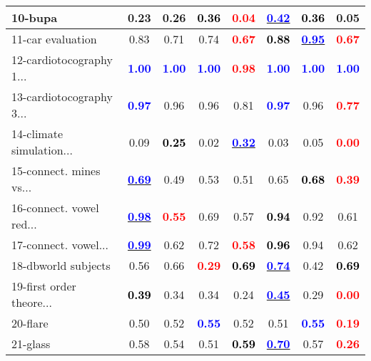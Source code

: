 \begin{table}[h]
\begin{center}
\begin{tabular}{lc|c|c|c|c|c|c}
10-bupa &   0.23 &   0.26 & \textcolor{black}{\textbf{  0.36}} & \textcolor{red}{\textbf{  0.04}} & \underline{\textcolor{blue}{\textbf{  0.42}}} & \textcolor{black}{\textbf{  0.36}} &   0.05 \\ \hline
11-car evaluation &   0.83 &   0.71 &   0.74 & \textcolor{red}{\textbf{  0.67}} & \textcolor{black}{\textbf{  0.88}} & \underline{\textcolor{blue}{\textbf{  0.95}}} & \textcolor{red}{\textbf{  0.67}} \\
12-cardiotocography 1... & \textcolor{blue}{\textbf{  1.00}} & \textcolor{blue}{\textbf{  1.00}} & \textcolor{blue}{\textbf{  1.00}} & \textcolor{red}{\textbf{  0.98}} & \textcolor{blue}{\textbf{  1.00}} & \textcolor{blue}{\textbf{  1.00}} & \textcolor{blue}{\textbf{  1.00}} \\
13-cardiotocography 3... & \textcolor{blue}{\textbf{  0.97}} &   0.96 &   0.96 &   0.81 & \textcolor{blue}{\textbf{  0.97}} &   0.96 & \textcolor{red}{\textbf{  0.77}} \\
14-climate simulation... &   0.09 & \textcolor{black}{\textbf{  0.25}} &   0.02 & \underline{\textcolor{blue}{\textbf{  0.32}}} &   0.03 &   0.05 & \textcolor{red}{\textbf{  0.00}} \\
15-connect. mines vs... & \underline{\textcolor{blue}{\textbf{  0.69}}} &   0.49 &   0.53 &   0.51 &   0.65 & \textcolor{black}{\textbf{  0.68}} & \textcolor{red}{\textbf{  0.39}} \\ \hline
16-connect. vowel red... & \underline{\textcolor{blue}{\textbf{  0.98}}} & \textcolor{red}{\textbf{  0.55}} &   0.69 &   0.57 & \textcolor{black}{\textbf{  0.94}} &   0.92 &   0.61 \\
17-connect. vowel... & \underline{\textcolor{blue}{\textbf{  0.99}}} &   0.62 &   0.72 & \textcolor{red}{\textbf{  0.58}} & \textcolor{black}{\textbf{  0.96}} &   0.94 &   0.62 \\
18-dbworld subjects &   0.56 &   0.66 & \textcolor{red}{\textbf{  0.29}} & \textcolor{black}{\textbf{  0.69}} & \underline{\textcolor{blue}{\textbf{  0.74}}} &   0.42 & \textcolor{black}{\textbf{  0.69}} \\
19-first order theore... & \textcolor{black}{\textbf{  0.39}} &   0.34 &   0.34 &   0.24 & \underline{\textcolor{blue}{\textbf{  0.45}}} &   0.29 & \textcolor{red}{\textbf{  0.00}} \\
20-flare &   0.50 &   0.52 & \textcolor{blue}{\textbf{  0.55}} &   0.52 &   0.51 & \textcolor{blue}{\textbf{  0.55}} & \textcolor{red}{\textbf{  0.19}} \\ \hline
21-glass &   0.58 &   0.54 &   0.51 & \textcolor{black}{\textbf{  0.59}} & \underline{\textcolor{blue}{\textbf{  0.70}}} &   0.57 & \textcolor{red}{\textbf{  0.26}} \\

\end{tabular}
\end{center}
\end{table}
